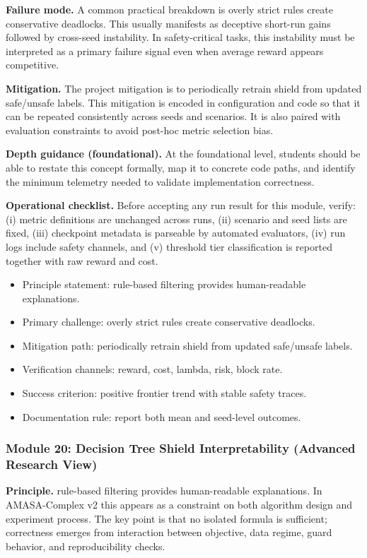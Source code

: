 \documentclass[conference]{IEEEtran}
\begin{document}
\textbf{Failure mode.} A common practical breakdown is overly strict rules create conservative deadlocks. This usually manifests as deceptive short-run gains followed by cross-seed instability. In safety-critical tasks, this instability must be interpreted as a primary failure signal even when average reward appears competitive.

\textbf{Mitigation.} The project mitigation is to periodically retrain shield from updated safe/unsafe labels. This mitigation is encoded in configuration and code so that it can be repeated consistently across seeds and scenarios. It is also paired with evaluation constraints to avoid post-hoc metric selection bias.

\textbf{Depth guidance (foundational).} At the foundational level, students should be able to restate this concept formally, map it to concrete code paths, and identify the minimum telemetry needed to validate implementation correctness.

\textbf{Operational checklist.} Before accepting any run result for this module, verify: (i) metric definitions are unchanged across runs, (ii) scenario and seed lists are fixed, (iii) checkpoint metadata is parseable by automated evaluators, (iv) run logs include safety channels, and (v) threshold tier classification is reported together with raw reward and cost.

\begin{itemize}[leftmargin=*]
  \item Principle statement: rule-based filtering provides human-readable explanations.
  \item Primary challenge: overly strict rules create conservative deadlocks.
  \item Mitigation path: periodically retrain shield from updated safe/unsafe labels.
  \item Verification channels: reward, cost, lambda, risk, block rate.
  \item Success criterion: positive frontier trend with stable safety traces.
  \item Documentation rule: report both mean and seed-level outcomes.
\end{itemize}


\subsubsection{Module 20: Decision Tree Shield Interpretability (Advanced Research View)}
\textbf{Principle.} rule-based filtering provides human-readable explanations. In AMASA-Complex v2 this appears as a constraint on both algorithm design and experiment process. The key point is that no isolated formula is sufficient; correctness emerges from interaction between objective, data regime, guard behavior, and reproducibility checks.
\end{document}
